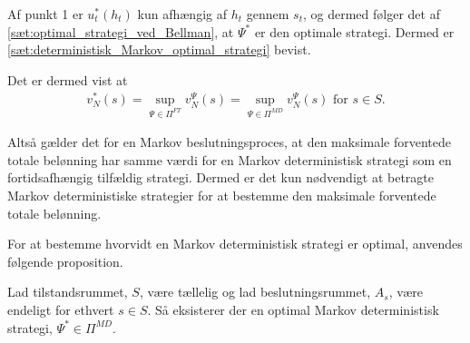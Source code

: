 \begin{bev}
Af punkt 1 er $u_t^*(h_t)$ kun afhængig af $h_t$ gennem $s_t$, og dermed følger det af \autoref{sæt:optimal_strategi_ved_Bellman}, at $\Psi^*$ er den optimale strategi.
Dermed er \autoref{sæt:deterministisk_Markov_optimal_strategi} bevist.
\end{bev}

Det er dermed vist at
\begin{align*}
    v_N^*(s)=\sup_{\Psi\in\Pi^{FT}}v_N^\Psi(s)=\sup_{\Psi\in\Pi^{MD}}v_N^\Psi(s) \text{ for } s\in S.
\end{align*}

Altså gælder det for en Markov beslutningsproces, at den maksimale forventede totale belønning har samme værdi for en Markov deterministisk strategi som en fortidsafhængig tilfældig strategi. Dermed er det kun nødvendigt at betragte Markov deterministiske strategier for at bestemme den maksimale forventede totale belønning. 

For at bestemme hvorvidt en Markov deterministisk strategi er optimal, anvendes følgende proposition. 

\begin{minipage}\textwidth
\begin{pro} \textbf{}\label{prop:markov_det_strategi} %
\newline
Lad tilstandsrummet, $S$, være tællelig og lad beslutningsrummet, $A_s$, være endeligt for ethvert $s\in S$. Så eksisterer der en optimal Markov deterministisk strategi, $\Psi^*\in \Pi^{MD}$.  
\end{pro}
\end{minipage}

